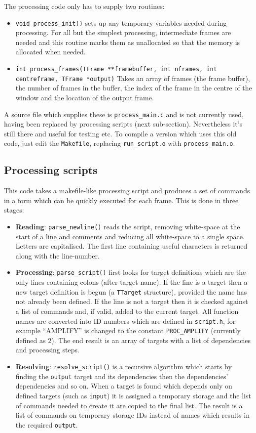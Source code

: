 \documentclass[12pt, a4paper]{article}
\begin{document}
The processing code only has to supply two routines:
\begin{itemize}
\item \texttt{void process\_init()} sets up any temporary variables needed during
processing. For all but the simplest processing, intermediate frames are needed
and this routine marks them as unallocated so that the memory is allocated when
needed.
\item \texttt{int process\_frames(TFrame **framebuffer, int nframes, int centreframe,
TFrame *output)} Takes an array of frames (the frame buffer), the number of frames
in the buffer, the index of the frame in the centre of the window and the location
of the output frame.
\end{itemize}
A source file which supplies these is \texttt{process\_main.c} and is not
currently used, having been replaced by processing scripts (next sub-section).
Nevertheless it's still there and useful for testing etc. To compile a version
which uses this old code, just edit the \texttt{Makefile}, replacing
\texttt{run\_script.o} with \texttt{process\_main.o}. 

\subsection{Processing scripts}

This code takes a makefile-like processing script and produces a set of commands in a form
which can be quickly executed for each frame. This is done in three stages:
\begin{itemize}
\item {\bf Reading}: \texttt{parse\_newline()} reads the script, removing white-space
at the start of a line and comments and reducing all white-space to a single space. Letters are
capitalised. The first line containing useful characters is returned along with the line-number.
\item {\bf Processing}: \texttt{parse\_script()} first looks for target definitions which are
the only lines containing colons (after target name). If the line is a target then a new
target definition is begun (a \texttt{TTarget} structure), provided the name has not already been
defined. If the line is not a target then it is checked against a list of commands and, if valid,
added to the current target. All function names are converted into
ID numbers which are defined in \texttt{script.h}, for example ``AMPLIFY''
is changed to the constant \texttt{PROC\_AMPLIFY} (currently defined as 2).
The end result is an array of targets with a list of dependencies
and processing steps.
\item {\bf Resolving}: \texttt{resolve\_script()} is a recursive algorithm which starts by finding
the \texttt{output} target and its dependencies then the dependencies' dependencies and
so on. When a target is found which depends only on defined targets (such as \texttt{input})
it is assigned a temporary storage and the list of commands needed to create it are copied
to the final list. The result is a list of commands on temporary storage IDs instead of names
which results in the required \texttt{output}.
\end{itemize}
\end{document}
